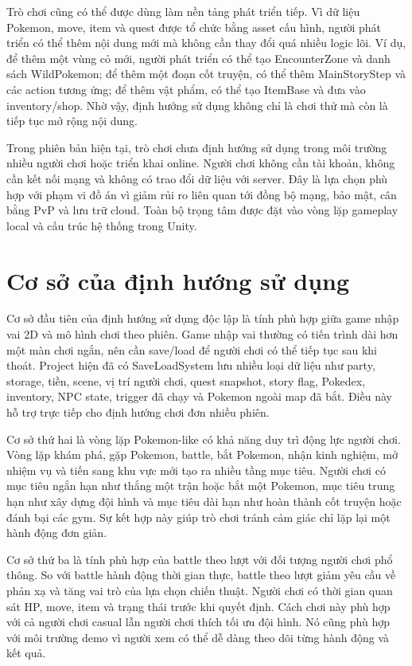 Trò chơi cũng có thể được dùng làm nền tảng phát triển tiếp. Vì dữ liệu Pokemon, move, item và quest được tổ chức bằng asset cấu hình, người phát triển có thể thêm nội dung mới mà không cần thay đổi quá nhiều logic lõi. Ví dụ, để thêm một vùng cỏ mới, người phát triển có thể tạo EncounterZone và danh sách WildPokemon; để thêm một đoạn cốt truyện, có thể thêm MainStoryStep và các action tương ứng; để thêm vật phẩm, có thể tạo ItemBase và đưa vào inventory/shop. Nhờ vậy, định hướng sử dụng không chỉ là chơi thử mà còn là tiếp tục mở rộng nội dung.

Trong phiên bản hiện tại, trò chơi chưa định hướng sử dụng trong môi trường nhiều người chơi hoặc triển khai online. Người chơi không cần tài khoản, không cần kết nối mạng và không có trao đổi dữ liệu với server. Đây là lựa chọn phù hợp với phạm vi đồ án vì giảm rủi ro liên quan tới đồng bộ mạng, bảo mật, cân bằng PvP và lưu trữ cloud. Toàn bộ trọng tâm được đặt vào vòng lặp gameplay local và cấu trúc hệ thống trong Unity.

\section{Cơ sở của định hướng sử dụng}

Cơ sở đầu tiên của định hướng sử dụng độc lập là tính phù hợp giữa game nhập vai 2D và mô hình chơi theo phiên. Game nhập vai thường có tiến trình dài hơn một màn chơi ngắn, nên cần save/load để người chơi có thể tiếp tục sau khi thoát. Project hiện đã có SaveLoadSystem lưu nhiều loại dữ liệu như party, storage, tiền, scene, vị trí người chơi, quest snapshot, story flag, Pokedex, inventory, NPC state, trigger đã chạy và Pokemon ngoài map đã bắt. Điều này hỗ trợ trực tiếp cho định hướng chơi đơn nhiều phiên.

Cơ sở thứ hai là vòng lặp Pokemon-like có khả năng duy trì động lực người chơi. Vòng lặp khám phá, gặp Pokemon, battle, bắt Pokemon, nhận kinh nghiệm, mở nhiệm vụ và tiến sang khu vực mới tạo ra nhiều tầng mục tiêu. Người chơi có mục tiêu ngắn hạn như thắng một trận hoặc bắt một Pokemon, mục tiêu trung hạn như xây dựng đội hình và mục tiêu dài hạn như hoàn thành cốt truyện hoặc đánh bại các gym. Sự kết hợp này giúp trò chơi tránh cảm giác chỉ lặp lại một hành động đơn giản.

Cơ sở thứ ba là tính phù hợp của battle theo lượt với đối tượng người chơi phổ thông. So với battle hành động thời gian thực, battle theo lượt giảm yêu cầu về phản xạ và tăng vai trò của lựa chọn chiến thuật. Người chơi có thời gian quan sát HP, move, item và trạng thái trước khi quyết định. Cách chơi này phù hợp với cả người chơi casual lẫn người chơi thích tối ưu đội hình. Nó cũng phù hợp với môi trường demo vì người xem có thể dễ dàng theo dõi từng hành động và kết quả.

